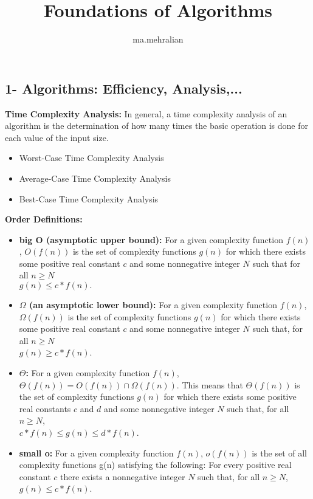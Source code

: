 \documentclass{../cheat}
\title{Foundations of Algorithms}
\author{ma.mehralian}
\begin{document}
\begin{multicols}{3}
\section{1- Algorithms: Efficiency, Analysis,... }
	\textbf{Time Complexity Analysis:} In general, a time complexity analysis of an algorithm is the determination of how many times the basic operation is done for each value of the input size. 
	\begin{itemize}[nolistsep, leftmargin=1em]
		\item Worst-Case Time Complexity Analysis
		\item Average-Case Time Complexity Analysis
		\item Best-Case Time Complexity Analysis 
	\end{itemize}

		\textbf{Order Definitions:}
	\begin{itemize}[nolistsep, leftmargin=1em]
		\item \textbf{big O (asymptotic upper bound):} For a given complexity function $f(n)$, $O(f(n))$ is the set of complexity functions $g(n)$ for which there exists some positive real constant $c$ and some nonnegative integer $N$ such that for all $n \geq N$ \\ $g(n) \leq c*f(n). $
		
		\item \textbf{$\Omega$ (an asymptotic lower bound):} For a given complexity  function $f(n)$, $\Omega(f(n))$ is the set of complexity functions $g(n)$ for which there exists some positive real constant $c$ and some nonnegative integer $N$ such that, for all $n \geq N$\\ $g(n) \geq c*f(n)$.
	
		\item \textbf{$\Theta$:} For a given complexity function $f(n)$, $\Theta(f(n)) = O(f(n)) \cap \Omega(f(n))$. 
	This means that $\Theta(f(n))$ is the set of complexity functions $g(n)$ for which there exists some positive real constants $c$ and $d$ and some nonnegative integer $N$ such that, for all $n \geq N$, \\
	$c*f(n) \leq g(n) \leq d*f(n)$. 
	
	
		\item \textbf{small o:} For a given complexity function $f(n)$, $o(f(n))$ is the set of all complexity functions g(n) satisfying the following:
		For every positive real constant $c$ there exists a nonnegative integer $N$ such that, for all $n \geq N$, 
		$g(n) \leq c*f(n)$.
		

\end{itemize}
\end{multicols}
\end{document}
